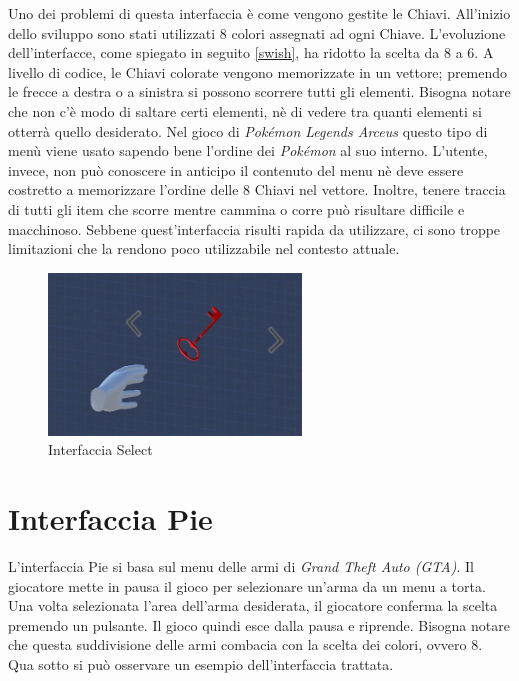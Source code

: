 \documentclass[target=bach,aauheader=]{thud}
\begin{document}
Uno dei problemi di questa interfaccia è come vengono gestite le Chiavi.
All'inizio dello sviluppo sono stati utilizzati 8 colori assegnati ad ogni Chiave.
L'evoluzione dell'interfacce, come spiegato in seguito \ref{swish}, ha ridotto la scelta da 8 a 6.
A livello di codice, le Chiavi colorate vengono memorizzate in un vettore; premendo le frecce a destra o a sinistra si possono scorrere tutti gli elementi.
Bisogna notare che non c'è modo di saltare certi elementi, nè di vedere tra quanti elementi si otterrà quello desiderato.
Nel gioco di \textit{Pokémon Legends Arceus} questo tipo di menù viene usato sapendo bene l'ordine dei \textit{Pokémon} al suo interno.
L'utente, invece, non può conoscere in anticipo il contenuto del menu nè deve essere costretto a memorizzare l'ordine delle 8 Chiavi nel vettore.
Inoltre, tenere traccia di tutti gli item che scorre mentre cammina o corre può risultare difficile e macchinoso.
Sebbene quest'interfaccia risulti rapida da utilizzare, ci sono troppe limitazioni che la rendono poco utilizzabile nel contesto attuale.

\begin{figure}[h]
    \centering
    \includegraphics[width=0.60\textwidth]{select}
    \caption{Interfaccia Select}
    \label{fig:select}
\end{figure}


\section{Interfaccia Pie} %
\label{pie}
L'interfaccia Pie si basa sul menu delle armi di \textit{Grand Theft Auto (GTA)}.
Il giocatore mette in pausa il gioco per selezionare un'arma da un menu a torta.
Una volta selezionata l'area dell'arma desiderata, il giocatore conferma la scelta premendo un pulsante.
Il gioco quindi esce dalla pausa e riprende.
Bisogna notare che questa suddivisione delle armi combacia con la scelta dei colori, ovvero 8. 
Qua sotto si può osservare un esempio dell'interfaccia trattata.
\end{document}
